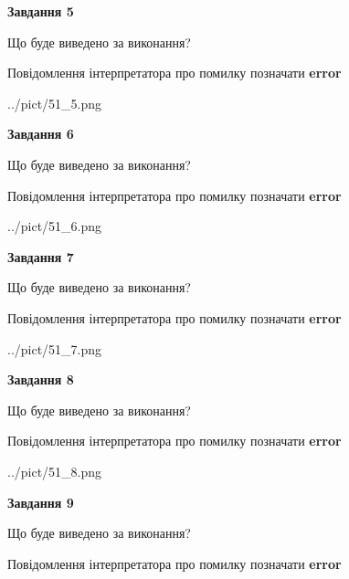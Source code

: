 \documentclass[11pt, ukrainian]{article}
\begin{document}
{\begin {large}
{\begin {center}\textbf{Завдання 5}\end {center}}\par
Що буде виведено за виконання? \par
Повідомлення інтерпретатора про помилку позначати \textbf{error}

\begin{center}
	{../pict/51_5.png}
\end{center}
\newpage

{\begin {center}\textbf{Завдання 6}\end {center}}\par
Що буде виведено за виконання? \par
Повідомлення інтерпретатора про помилку позначати \textbf{error}

\begin{center}
	{../pict/51_6.png}
\end{center}
\newpage

{\begin {center}\textbf{Завдання 7}\end {center}}\par
Що буде виведено за виконання? \par
Повідомлення інтерпретатора про помилку позначати \textbf{error}

\begin{center}
	{../pict/51_7.png}
\end{center}
\newpage

{\begin {center}\textbf{Завдання 8}\end {center}}\par
Що буде виведено за виконання? \par
Повідомлення інтерпретатора про помилку позначати \textbf{error}

\begin{center}
	{../pict/51_8.png}
\end{center}
\newpage

{\begin {center}\textbf{Завдання 9}\end {center}}\par
Що буде виведено за виконання? \par
Повідомлення інтерпретатора про помилку позначати \textbf{error}


\end{large}}
\end{document}
